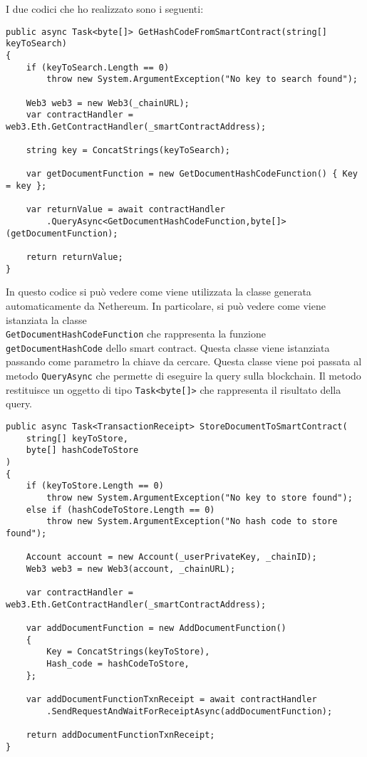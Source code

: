 \newpage

I due codici che ho realizzato sono i seguenti:
\begin{lstlisting}[language=CSharp]
public async Task<byte[]> GetHashCodeFromSmartContract(string[] keyToSearch)
{
    if (keyToSearch.Length == 0)
        throw new System.ArgumentException("No key to search found");

    Web3 web3 = new Web3(_chainURL);
    var contractHandler = web3.Eth.GetContractHandler(_smartContractAddress);

    string key = ConcatStrings(keyToSearch);

    var getDocumentFunction = new GetDocumentHashCodeFunction() { Key = key };

    var returnValue = await contractHandler
        .QueryAsync<GetDocumentHashCodeFunction,byte[]>(getDocumentFunction);

    return returnValue;
}
\end{lstlisting}

In questo codice si può vedere come viene utilizzata la classe generata
automaticamente da Nethereum. In particolare, si può vedere come viene
istanziata la classe \\ \texttt{GetDocumentHashCodeFunction} che rappresenta la
funzione \texttt{getDocumentHashCode} dello smart contract. Questa classe
viene istanziata passando come parametro la chiave da cercare. Questa classe
viene poi passata al metodo \texttt{QueryAsync} che permette di eseguire la
query sulla blockchain. Il metodo restituisce un oggetto di tipo
\texttt{Task<byte[]>} che rappresenta il risultato della query.

\begin{lstlisting}[language=CSharp]
public async Task<TransactionReceipt> StoreDocumentToSmartContract(
    string[] keyToStore,
    byte[] hashCodeToStore
)
{
    if (keyToStore.Length == 0)
        throw new System.ArgumentException("No key to store found");
    else if (hashCodeToStore.Length == 0) 
        throw new System.ArgumentException("No hash code to store found");

    Account account = new Account(_userPrivateKey, _chainID);
    Web3 web3 = new Web3(account, _chainURL);

    var contractHandler = web3.Eth.GetContractHandler(_smartContractAddress);

    var addDocumentFunction = new AddDocumentFunction()
    {
        Key = ConcatStrings(keyToStore),
        Hash_code = hashCodeToStore,
    };

    var addDocumentFunctionTxnReceipt = await contractHandler
        .SendRequestAndWaitForReceiptAsync(addDocumentFunction);

    return addDocumentFunctionTxnReceipt;
}\end{lstlisting}

